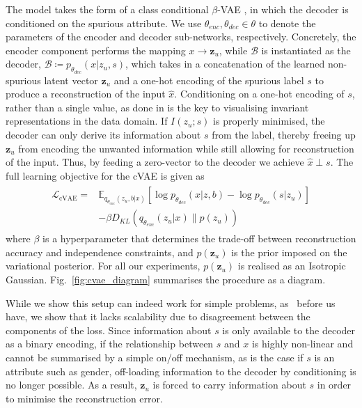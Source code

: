 The model takes the form of a class conditional $\beta$-VAE \citep{higgins2017beta}, in which the decoder is conditioned on the spurious attribute.
We use $\theta_{enc}, \theta_{dec} \in \theta$ to denote the parameters of the encoder and decoder sub-networks, respectively.
Concretely, the encoder component performs the mapping $x \rightarrow{\bm{z}_u}$, while $\mathcal{B}$ is instantiated as the decoder,
$\mathcal{B} \coloneqq p_{\theta_{dec}}(x|z_u, s)$, which takes in a concatenation of the learned non-spurious latent vector $\bm{z}_u$ and a one-hot encoding of the spurious label $s$ to produce a reconstruction of the input $\hat{x}$.
Conditioning on a one-hot encoding of $s$, rather than a single value, as done in \citet{madras2018learning} is the key to visualising invariant representations in the data domain.
If $I(z_u; s)$ is properly minimised, the decoder can only derive its information about $s$ from the label, thereby freeing up $\bm{z}_u$ from encoding the unwanted information while still allowing for reconstruction of the input.
Thus, by feeding a zero-vector to the decoder we achieve $\hat{x} \perp s$.
The full learning objective for the cVAE is given as
\begin{align}
\begin{split}
    \mathcal{L}_{\mathrm{cVAE}} =& \mathbb{E}_{q_{\theta_{enc}}(z_u, b|x)}[\log p_{\theta_{dec}}(x|z, b) - \log p_{\theta_{dec}}(s|z_u)] \\ 
    &- \beta D_{KL}(q_{\theta_{enc}}(z_u |x) \| p(z_u))
\end{split}
\end{align}
where $\beta$ is a hyperparameter that determines the trade-off between reconstruction accuracy and independence constraints,
and $p(\bm{z}_u)$ is the prior imposed on the variational posterior.
For all our experiments, $p(\bm{z}_u)$ is realised as an Isotropic Gaussian.
Fig.~\ref{fig:cvae_diagram} summarises the procedure as a diagram.

While we show this setup can indeed work for simple problems, as~\citet{madras2018learning} before us have, we show that it lacks scalability due to disagreement between the components of the loss.
Since information about $s$ is only available to the decoder as a binary encoding,
if the relationship between $s$ and $x$ is highly non-linear and cannot be summarised by a simple on/off mechanism, as is the case if $s$ is an attribute such as gender,
off-loading information to the decoder by conditioning is no longer possible. As a result, $\bm{z}_u$ is forced to carry information about $s$ in order to minimise the reconstruction error. 

